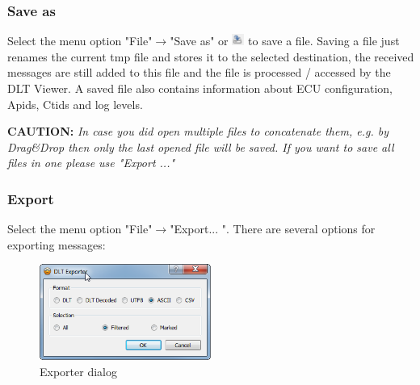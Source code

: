\documentclass[a4paper,11pt]{article}
\newcommand{\caution}[1]{\begin{ibox} \textbf{CAUTION:} \emph{#1} \end{ibox}}
\begin{document}
\subsubsection{Save as}
Select the menu option "File"\ensuremath{\rightarrow}"Save as" or \includegraphics[width=0.03\textwidth]{images/saveas_icon.png} to save a file.
Saving a file just renames the current tmp file and stores it to the selected destination, the received messages are still
added to this file and the file is processed / accessed by the DLT Viewer. A saved file also contains information about ECU configuration, Apids, Ctids
and log levels.

\caution{In case you did open multiple files to concatenate them, e.g. by Drag\&Drop then only the last opened file will be saved. If you want to save all files in one please use "Export ..."}

\subsubsection{Export}
Select the menu option "File"\ensuremath{\rightarrow}"Export... ". 
There are several options for exporting messages:
\vspace{0.3cm}

\begin{figure}[H]
 \centering
   \includegraphics[width=0.5\textwidth]{images/DLTExporter.png}
 \caption{Exporter dialog}
 \label{fig:exportdialog}
\end{figure}
\end{document}
